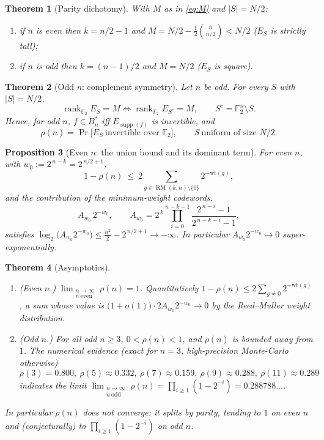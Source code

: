 \documentclass{amsart}
\newtheorem{theorem}{Theorem}
\newtheorem{proposition}[theorem]{Proposition}
\theoremstyle{definition}
\DeclareMathOperator{\supp}{supp}
\DeclareMathOperator{\RM}{RM}
\DeclareMathOperator{\rank}{rank}
\newcommand{\F}{\mathbb{F}}
\begin{document}
\begin{theorem}[Parity dichotomy]\label{thm:dichotomy}
With $M$ as in \eqref{eq:M} and $|S|=N/2$:
\begin{enumerate}
\item if $n$ is even then $k=n/2-1$ and $M=N/2-\tfrac12\binom n{n/2}<N/2$
      ($E_S$ is strictly tall);
\item if $n$ is odd then $k=(n-1)/2$ and $M=N/2$ ($E_S$ is square).
\end{enumerate}
\end{theorem}

\begin{theorem}[Odd $n$: complement symmetry]\label{thm:odd-sym}
Let $n$ be odd. For every $S$ with $|S|=N/2$,
\[
\rank_{\F_2}E_S=M\iff \rank_{\F_2}E_{S^c}=M,\qquad S^c=\F_2^n\setminus S.
\]
Hence, for odd $n$, $f\in B_n^*$ iff $E_{\supp(f)}$ is invertible, and
\begin{equation}\label{eq:odd-rho}
\rho(n)=\Pr\bigl[E_{S}\ \text{invertible over }\F_2\bigr],\qquad
S\ \text{uniform of size }N/2 .
\end{equation}
\end{theorem}

\begin{proposition}[Even $n$: the union bound and its dominant term]
\label{prop:evenmin}
For even $n$, with $w_0:=2^{\,n-k}=2^{\,n/2+1}$,
\begin{equation}\label{eq:even-bound}
1-\rho(n)\ \le\ 2\sum_{g\in\RM(k,n)\setminus\{0\}}2^{-\mathrm{wt}(g)},
\end{equation}
and the contribution of the minimum-weight codewords,
\[
A_{w_0}\,2^{-w_0},\qquad
A_{w_0}=2^{\,k}\prod_{i=0}^{n-k-1}\frac{2^{\,n-i}-1}{2^{\,n-k-i}-1},
\]
satisfies $\log_2\bigl(A_{w_0}2^{-w_0}\bigr)\le \tfrac{n^2}{2}-2^{\,n/2+1}
\to-\infty$. In particular $A_{w_0}2^{-w_0}\to0$ super-exponentially.
\end{proposition}

\begin{theorem}[Asymptotics]\label{thm:asy}
\begin{enumerate}
\item (Even $n$.) $\displaystyle\lim_{\substack{n\to\infty\\ n\
      \mathrm{even}}}\rho(n)=1$. Quantitatively
      $1-\rho(n)\le 2\sum_{g\ne0}2^{-\mathrm{wt}(g)}$, a sum whose value
      is $\bigl(1+o(1)\bigr)\cdot 2A_{w_0}2^{-w_0}\to0$ by the
      Reed--Muller weight distribution.
\item (Odd $n$.) For all odd $n\ge3$, $0<\rho(n)<1$, and $\rho(n)$ is
      bounded away from $1$. The numerical evidence (exact for $n=3$,
      high-precision Monte-Carlo otherwise)
      \[
      \rho(3)=0.800,\ \rho(5)\approx0.332,\ \rho(7)\approx0.159,\
      \rho(9)\approx0.288,\ \rho(11)\approx0.289
      \]
      indicates the limit
      $\displaystyle\lim_{\substack{n\to\infty\\ n\
      \mathrm{odd}}}\rho(n)=\prod_{i\ge1}(1-2^{-i})=0.288788\ldots$.
\end{enumerate}
In particular $\rho(n)$ does not converge: it splits by parity, tending to
$1$ on even $n$ and (conjecturally) to $\prod_{i\ge1}(1-2^{-i})$ on odd
$n$.
\end{theorem}
\end{document}
